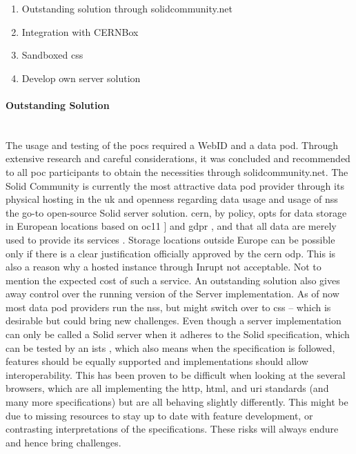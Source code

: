 \begin{enumerate}
    \item Outstanding solution through solidcommunity.net
    \item Integration with CERNBox
    \item Sandboxed \gls{css}
    \item Develop own server solution
\end{enumerate}

\paragraph{Outstanding Solution}\mbox{}\\

The usage and testing of the \glspl{poc} required a WebID and a data pod. Through extensive research and careful considerations, it was concluded and recommended to all \gls{poc} participants to obtain the necessities through solidcommunity.net. The Solid Community is currently the most attractive data pod provider through its physical hosting in the \gls{uk} and openness regarding data usage and usage of \gls{nss} the go-to open-source Solid server solution. \gls{cern}, by policy, opts for data storage in European locations based on \gls{oc11} \cite{oc11}] and \gls{gdpr} \cite{gdpr}, and that all data are merely used to provide its services \cite{policy-cern-server}. Storage locations outside Europe can be possible only if there is a clear justification officially approved by the \gls{cern} \gls{odp}. This is also a reason why a hosted instance through Inrupt \cite{inrupt} not acceptable. Not to mention the expected cost of such a service. An outstanding solution also gives away control over the running version of the Server implementation. As of now most data pod providers run the \gls{nss}, but might switch over to \gls{css} -- which is desirable but could bring new challenges. Even though a server implementation can only be called a Solid server when it adheres to the Solid specification, which can be tested by an \gls{ists} \cite{solid-test-suite}, which also means when the specification is followed, features should be equally supported and implementations should allow interoperability. This has been proven to be difficult when looking at the several browsers, which are all implementing the \gls{http}, \gls{html}, and \gls{uri} standards (and many more specifications) but are all behaving slightly differently. This might be due to missing resources to stay up to date with feature development, or contrasting interpretations of the specifications. These risks will always endure and hence bring challenges.
\vspace{0.5cm}
